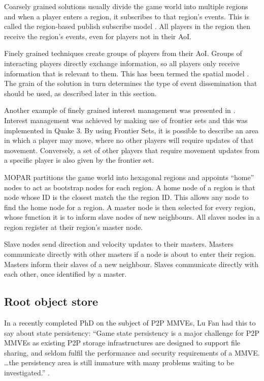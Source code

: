 Coarsely grained solutions usually divide the game world into multiple regions and when a player enters a region, it subscribes to that region's
events. This is called the region-based publish subscribe model \cite{Fan_deisgn_issues_p2p}. All players in the region then receive the region's events, even for players not in their AoI.

Finely grained techniques create groups of players from their AoI. Groups of interacting players directly exchange information, so all players
only receive information that is relevant to them. This has been termed the spatial model \cite{Fan_deisgn_issues_p2p}. The grain of the solution in
turn determines the type of event dissemination that should be used, as described later in this section.

Another example of finely grained interest management was presented in \cite{IM_frontier_sets}. Interest management was achieved by making use of
frontier sets and this was implemented in Quake 3. By using Frontier Sets, it is possible to describe an area in which a player may move, where no
other players will require updates of that movement. Conversely, a set of other players that require movement updates from a specific player is also
given by the frontier set.

MOPAR partitions the game world into hexagonal regions and appoints ``home'' nodes to act as bootstrap nodes for each region. A home node of a region
is that node whose ID is the closest match the the region ID. This allows any node to find the home node for a region. A master node is then selected
for every region, whose function it is to inform slave nodes of new neighbours. All slaves nodes in a region register at their region's master node.

Slave nodes send direction and velocity updates to their masters. Masters communicate directly with other masters if a node is about to enter their
region. Masters inform their slaves of a new neighbour. Slaves communicate directly with each other, once identified by a master.

\subsection{Root object store}


In a recently completed PhD on the subject of P2P MMVEs, Lu Fan had this to say about state persistency: ``Game state persistency is a major challenge for P2P MMVEs as existing P2P storage infrastructures are designed to support file sharing, and seldom fulfil the performance and security requirements of a MMVE. \ldots the persistency area is still immature with many problems waiting to be investigated.'' \cite{Fan_phd}.

